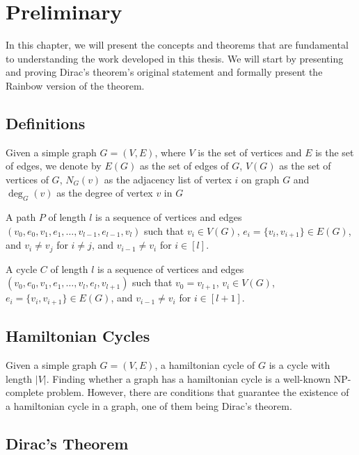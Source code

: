 
\chapter{Preliminary}

In this chapter, we will present the concepts and theorems that are fundamental to understanding the 
work developed in this thesis. We will start by presenting and proving Dirac's theorem's original
statement and formally present the Rainbow version of the theorem.

\section{Definitions}

Given a simple graph $G = (V, E)$, where $V$ is the set of vertices and $E$ is the set of edges, we denote by $E(G)$ as
the set of edges of $G$, $V(G)$ as the set of vertices of $G$, $N_G(v)$ as the adjacency list of vertex $i$ on graph $G$ 
and $\deg_G(v)$ as the degree of vertex $v$ in $G$

A path $P$ of length $l$ is a sequence of vertices and edges $(v_0, e_0, v_1, e_1, \ldots, v_{l - 1}, e_{l - 1}, v_{l})$ such that
$v_i \in V(G)$, $e_i = \{v_i, v_{i + 1}\} \in E(G)$, and $v_i \neq v_j$ for $i \neq j$, and $v_{i-1} \neq v_{i}$ for $i \in [l]$.

A cycle $C$ of length $l$ is a sequence of vertices and edges $(v_0, e_0, v_1, e_1, \ldots, v_{l}, e_{l}, v_{l + 1})$ such that
$v_{0} = v_{l + 1}$, $v_i \in V(G)$, $e_i = \{v_i, v_{i + 1}\} \in E(G)$, and $v_{i-1} \neq v_{i}$ for $i \in [l + 1]$.

\section{Hamiltonian Cycles}

Given a simple graph $G = (V, E)$, a hamiltonian cycle of $G$ is a cycle with length $|V|$.
Finding whether a graph has a hamiltonian cycle is a well-known NP-complete problem. 
However, there are conditions that guarantee the existence of a hamiltonian cycle in a graph, one of them being Dirac's theorem.

\section{Dirac's Theorem}

